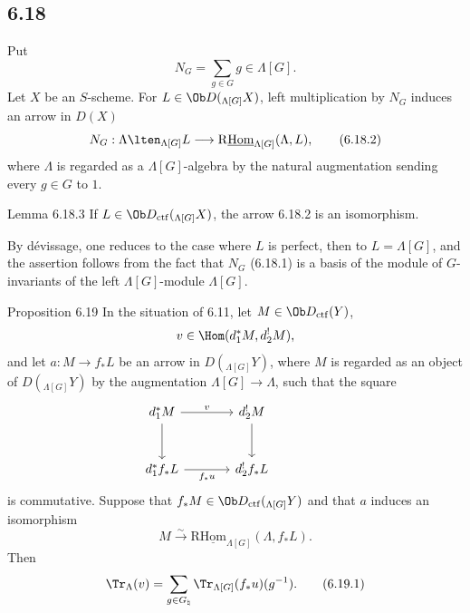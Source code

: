 \subsection*{6.18}
Put
\begin{equation}
N_G=\sum_{g\in G} g\in\Lambda[G].
\tag{6.18.1}
\end{equation}
Let $X$ be an $S$-scheme. For $L\in\Ob D({}_{\Lambda[G]}X)$, left multiplication by $N_G$ induces an arrow in $D(X)$
\begin{equation}
N_G:\Lambda\lten_{\Lambda[G]}L
\longrightarrow
\mathrm{R}\underline{\mathrm{Hom}}_{\Lambda[G]}(\Lambda,L),
\tag{6.18.2}
\end{equation}
where $\Lambda$ is regarded as a $\Lambda[G]$-algebra by the natural augmentation sending every $g\in G$ to $1$.

\begin{statement}{Lemma 6.18.3}
If $L\in\Ob D_{\mathrm{ctf}}({}_{\Lambda[G]}X)$, the arrow 6.18.2 is an isomorphism.
\end{statement}

By dévissage, one reduces to the case where $L$ is perfect, then to $L=\Lambda[G]$, and the assertion follows from the fact that $N_G$ (6.18.1) is a basis of the module of $G$-invariants of the left $\Lambda[G]$-module $\Lambda[G]$.

\begin{statement}{Proposition 6.19}
In the situation of 6.11, let $M\in\Ob D_{\mathrm{ctf}}(Y)$,
\[
v\in\Hom(d_1^*M,d_2^!M),
\]
and let $a:M\to f_*L$ be an arrow in $D({}_{\Lambda[G]}Y)$, where $M$ is regarded as an object of $D({}_{\Lambda[G]}Y)$ by the augmentation $\Lambda[G]\to\Lambda$, such that the square
\[
\begin{tikzcd}[column sep=large,row sep=large]
d_1^*M \arrow[r,"v"] \arrow[d] & d_2^!M \arrow[d] & {}\\
d_1^*f_*L \arrow[r,"f_*u"'] & d_2^!f_*L
\end{tikzcd}
\]
is commutative. Suppose that $f_*M\in\Ob D_{\mathrm{ctf}}({}_{\Lambda[G]}Y)$ and that $a$ induces an isomorphism
\[
M\xrightarrow{\sim}\mathrm{R}\underline{\mathrm{Hom}}_{\Lambda[G]}(\Lambda,f_*L).
\]
Then
\begin{equation}
\Tr_{\Lambda}(v)=
\sum_{g\in G_{\natural}}\Tr_{\Lambda[G]}(f_*u)(g^{-1}).
\tag{6.19.1}
\end{equation}
\end{statement}

